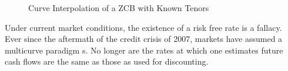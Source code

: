 \documentclass{article}
\begin{document}
\begin{figure}[h]
    \centering
    \caption{Curve Interpolation of a ZCB with Known Tenors}
\end{figure}

Under current market conditions, the existence of a risk free rate is a fallacy. Ever since the aftermath of the credit crisis of 2007, markets have assumed a multicurve paradigm \citep{len}s. No longer are the rates at which one estimates future cash flows are the same as those as used for discounting.

\newpage
\nocite{*}

\end{document}
